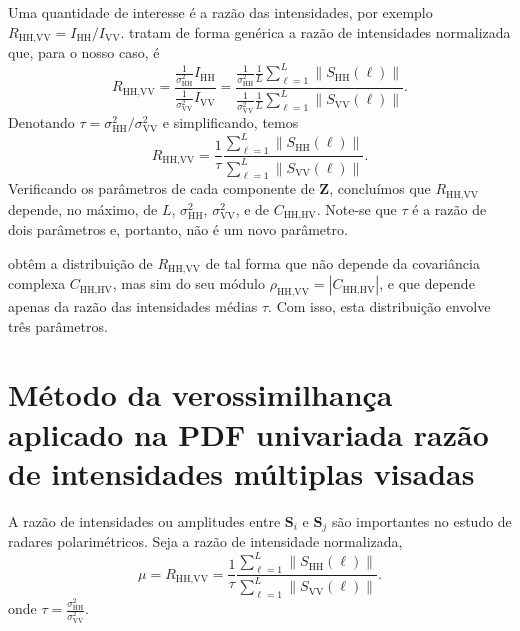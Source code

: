 \documentclass[12pt]{article}
\begin{document}
Uma quantidade de interesse é a razão das intensidades, por exemplo $R_{\text{HH,VV}} = I_{\text{HH}} / I_{\text{VV}}$.
\citet{lee} tratam de forma genérica a razão de intensidades normalizada que, para o nosso caso, é
$$
R_{\text{HH,VV}} = \frac{\frac1{\sigma_{\text{HH}}^2}I_{\text{HH}}}
						{\frac1{\sigma_{\text{VV}}^2}I_{\text{VV}}} = 
	\frac{\frac1{\sigma_{\text{HH}}^2} \frac1L \sum_{\ell=1}^{L}\|S_{\text{HH}}(\ell)\|}
	{\frac1{\sigma_{\text{VV}}^2} \frac1L \sum_{\ell=1}^{L}\|S_{\text{VV}}(\ell)\|}.
$$
Denotando $\tau = \sigma_{\text{HH}}^2 / \sigma_{\text{VV}}^2$ e simplificando, temos
$$
R_{\text{HH,VV}} = \frac{1}{\tau}
\frac{\sum_{\ell=1}^{L}\|S_{\text{HH}}(\ell)\|}
{\sum_{\ell=1}^{L}\|S_{\text{VV}}(\ell)\|}.
$$
Verificando os parâmetros de cada componente de $\bm Z$, concluímos que $R_{\text{HH,VV}}$ depende, no máximo, de $L$, $\sigma_{\text{HH}}^2$, $\sigma_{\text{VV}}^2$, e de $C_{\text{HH,HV}}$.
Note-se que $\tau$ é a razão de dois parâmetros e, portanto, não é um novo parâmetro.

\citet{lee} obtêm a distribuição de $R_{\text{HH,VV}}$ de tal forma que não depende da covariância complexa $C_{\text{HH,HV}}$, mas sim do seu módulo $\rho_{\text{HH,VV}}=|C_{\text{HH,HV}}|$, e que depende apenas da razão das intensidades médias $\tau$.
Com isso, esta distribuição envolve três parâmetros.


\section{Método da verossimilhança aplicado na PDF univariada razão de intensidades múltiplas visadas}

A razão de intensidades ou amplitudes entre $\mathbf{S}_i$ e $\mathbf{S}_j$ são importantes no estudo de radares polarimétricos. Seja a razão de intensidade normalizada,
\begin{equation}\label{eq:razao_intensidades}
 \mu=R_{\text{HH,VV}} = \frac{1}{\tau}
\frac{\sum_{\ell=1}^{L}\|S_{\text{HH}}(\ell)\|}
{\sum_{\ell=1}^{L}\|S_{\text{VV}}(\ell)\|}.
\end{equation}
onde $\tau=\frac{\sigma^2_{\text{HH}}}{\sigma^2_{\text{VV}}}$.
  
\end{document}
